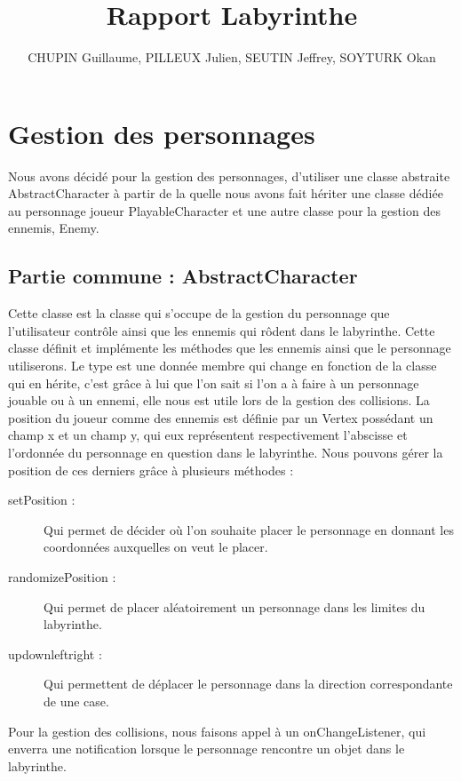 \documentclass [10pt, a4paper]{article}
\title {Rapport Labyrinthe}
\author {CHUPIN Guillaume, PILLEUX Julien, SEUTIN Jeffrey, SOYTURK Okan}
\begin{document}
\maketitle
\newpage

\tableofcontents
\newpage

\section {Gestion des personnages}
Nous avons décidé pour la gestion des personnages, d'utiliser une classe abstraite AbstractCharacter à partir de la quelle nous avons fait hériter une classe dédiée au personnage joueur PlayableCharacter et une autre classe pour la gestion des ennemis, Enemy.

\subsection {Partie commune : AbstractCharacter}
Cette classe est la classe qui s'occupe de la gestion du personnage que l'utilisateur contrôle ainsi que les ennemis qui rôdent dans le labyrinthe. Cette classe définit et implémente les méthodes que les ennemis ainsi que le personnage utiliserons. Le type est une donnée membre qui change en fonction de la classe qui en hérite, c'est grâce à lui que l'on sait si l'on a à faire à un personnage jouable ou à un ennemi, elle nous est utile lors de la gestion des collisions. La position du joueur comme des ennemis est définie par un Vertex possédant un champ x et un champ y, qui eux représentent respectivement l'abscisse et l'ordonnée du personnage en question dans le labyrinthe. Nous pouvons gérer la position de ces derniers grâce à plusieurs méthodes :
\begin {description}
\item  [setPosition :]             Qui permet de décider où l'on souhaite placer le personnage en donnant les coordonnées auxquelles on veut le placer.
\item  [randomizePosition :]       Qui permet de placer aléatoirement un personnage dans les limites du labyrinthe.
\item  [up\/down\/left\/right\/ :] Qui permettent de déplacer le personnage dans la direction correspondante de une case.
\end   {description}
Pour la gestion des collisions, nous faisons appel à un onChangeListener, qui enverra une notification lorsque le personnage rencontre un objet dans le labyrinthe.
\end{document}
